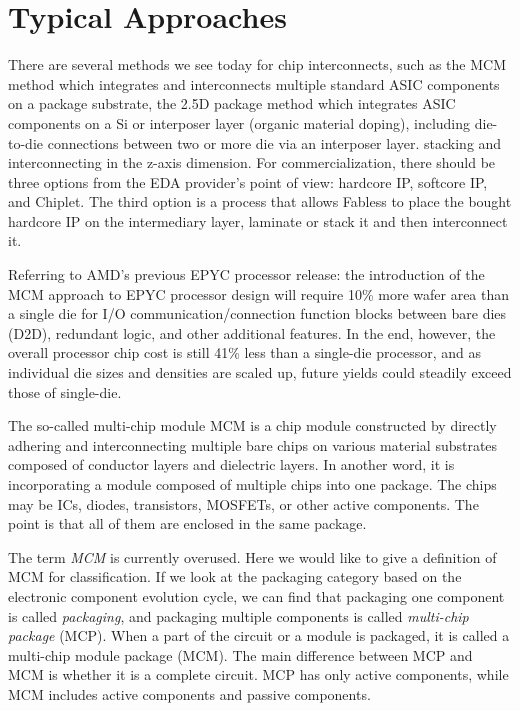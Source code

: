 
\chapter{Typical Approaches}
\begin{spacing}{1.5}
\setlength{\parskip}{0.3in}

There are several methods we see today for chip interconnects, such as the MCM method which integrates and interconnects multiple standard ASIC components on a package substrate, the 2.5D package method which integrates ASIC components on a Si or interposer layer (organic material doping), including die-to-die connections between two or more die via an interposer layer. stacking and interconnecting in the z-axis dimension. For commercialization, there should be three options from the EDA provider's point of view: hardcore IP, softcore IP, and Chiplet. The third option is a process that allows Fabless to place the bought hardcore IP on the intermediary layer, laminate or stack it and then interconnect it.

Referring to AMD's previous EPYC processor release: the introduction of the MCM approach to EPYC processor design will require 10\% more wafer area than a single die for I/O communication/connection function blocks between bare dies (D2D), redundant logic, and other additional features. In the end, however, the overall processor chip cost is still 41\% less than a single-die processor, and as individual die sizes and densities are scaled up, future yields could steadily exceed those of single-die.

The so-called multi-chip module MCM is a chip module constructed by directly adhering and interconnecting multiple bare chips on various material substrates composed of conductor layers and dielectric layers. In another word, it is incorporating a module composed of multiple chips into one package. The chips may be ICs, diodes, transistors, MOSFETs, or other active components. The point is that all of them are enclosed in the same package.

The term \textit{MCM} is currently overused. Here we would like to give a definition of MCM for classification. If we look at the packaging category based on the electronic component evolution cycle, we can find that packaging one component is called \textit{packaging}, and packaging multiple components is called \textit{multi-chip package} (MCP). When a part of the circuit or a module is packaged, it is called a multi-chip module package (MCM). The main difference between MCP and MCM is whether it is a complete circuit. MCP has only active components, while MCM includes active components and passive components. 


\end{spacing}
